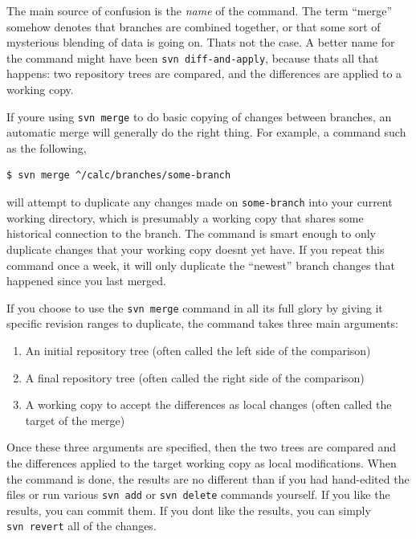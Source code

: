 The main source of confusion is the \emph{name} of the command. The term
``merge'' somehow denotes that branches are combined together, or that
some sort of mysterious blending of data is going on.
That\textquotesingle s not the case. A better name for the command might
have been \texttt{svn\ diff-and-apply}, because that\textquotesingle s
all that happens: two repository trees are compared, and the differences
are applied to a working copy.

If you\textquotesingle re using \texttt{svn\ merge} to do basic copying
of changes between branches, an automatic merge will generally do the
right thing. For example, a command such as the following,

\begin{verbatim}
$ svn merge ^/calc/branches/some-branch
\end{verbatim}

will attempt to duplicate any changes made on \texttt{some-branch} into
your current working directory, which is presumably a working copy that
shares some historical connection to the branch. The command is smart
enough to only duplicate changes that your working copy
doesn\textquotesingle t yet have. If you repeat this command once a
week, it will only duplicate the ``newest'' branch changes that happened
since you last merged.

If you choose to use the \texttt{svn\ merge} command in all its full
glory by giving it specific revision ranges to duplicate, the command
takes three main arguments:

\begin{enumerate}
\def\labelenumi{\arabic{enumi}.}
\item
  An initial repository tree (often called the left side of the
  comparison)
\item
  A final repository tree (often called the right side of the
  comparison)
\item
  A working copy to accept the differences as local changes (often
  called the target of the merge)
\end{enumerate}

Once these three arguments are specified, then the two trees are
compared and the differences applied to the target working copy as local
modifications. When the command is done, the results are no different
than if you had hand-edited the files or run various \texttt{svn\ add}
or \texttt{svn\ delete} commands yourself. If you like the results, you
can commit them. If you don\textquotesingle t like the results, you can
simply \texttt{svn\ revert} all of the changes.

